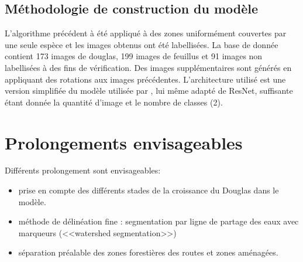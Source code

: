 \documentclass{article}
\begin{document}
	\subsection{Méthodologie de construction du modèle}

		L'algorithme précédent à été appliqué à des zones uniformément couvertes par une seule espèce et les images obtenus ont été labellisées. La base de donnée contient 173 images de douglas, 199 images de feuillus et 91 images non labellisées à des fins de vérification. Des images supplémentaires sont générés en appliquant des rotations aux images précédentes.
		L'architecture utilisé est une version simplifiée du modèle utilisée par , lui même adapté de ResNet, suffisante étant donnée la quantité d'image et le nombre de classes (2).

\section{Prolongements envisageables}

	Différents prolongement sont envisageables: 
	\begin{itemize}
		\item prise en compte des différents stades de la croissance du Douglas dans le modèle.
		\item méthode de délinéation fine : segmentation par ligne de partage des eaux avec marqueurs (<<watershed segmentation>>)
		\item séparation préalable des zones forestières des routes et zones aménagées. 
	\end{itemize}





\nocite{1}
\nocite{2}
\nocite{3}
\nocite{4}
\nocite{5}



\appendix
\end{document}
